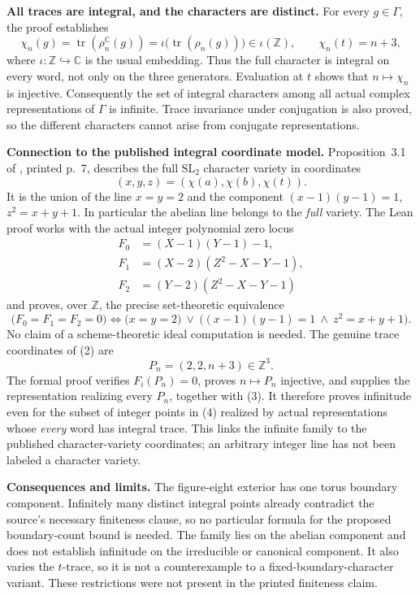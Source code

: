 \documentclass[10pt,a4paper]{article}
\begin{document}
\textbf{All traces are integral, and the characters are distinct.}
For every $g\in\Gamma$, the proof establishes
\[
 \chi_n(g)=\operatorname{tr}(\rho_n^{\mathbb C}(g))
    =\iota\bigl(\operatorname{tr}(\rho_n(g))\bigr)\in\iota(\mathbb Z),
 \qquad \chi_n(t)=n+3, \tag{3}
\]
where $\iota:\mathbb Z\hookrightarrow\mathbb C$ is the usual embedding.
Thus the full character is integral on every word, not only on the three
generators. Evaluation at $t$ shows that $n\mapsto\chi_n$ is injective.
Consequently the set of integral characters among all actual complex
representations of $\Gamma$ is infinite. Trace invariance under conjugation
is also proved, so the different characters cannot arise from conjugate
representations.

\newpage
\textbf{Connection to the published integral coordinate model.}
Proposition~3.1 of \cite{hmp}, printed p.~7, describes the full
$\mathrm{SL}_2$ character variety in coordinates
\[
 (x,y,z)=(\chi(a),\chi(b),\chi(t)).
\]
It is the union of the line $x=y=2$ and the component
$(x-1)(y-1)=1$, $z^2=x+y+1$. In particular the abelian line belongs to
the \emph{full} variety. The Lean proof works with the actual integer
polynomial zero locus
\[
 \begin{split}
 F_0&=(X-1)(Y-1)-1,\\
 F_1&=(X-2)(Z^2-X-Y-1),\\
 F_2&=(Y-2)(Z^2-X-Y-1)
 \end{split} \tag{4}
\]
and proves, over $\mathbb Z$, the precise set-theoretic equivalence
\[
 \bigl(F_0=F_1=F_2=0\bigr)\iff
 \bigl(x=y=2\bigr)\ \lor\
 \bigl((x-1)(y-1)=1\ \land\ z^2=x+y+1\bigr).
\]
No claim of a scheme-theoretic ideal computation is needed.
The genuine trace coordinates of (2) are
\[
 P_n=(2,2,n+3)\in\mathbb Z^3. \tag{5}
\]
The formal proof verifies $F_i(P_n)=0$, proves $n\mapsto P_n$ injective,
and supplies the representation realizing every $P_n$, together with (3).
It therefore proves infinitude even for the subset of integer points in (4)
realized by actual representations whose \emph{every} word has integral trace.
This links the infinite family to the published character-variety coordinates;
an arbitrary integer line has not been labeled a character variety.

\textbf{Consequences and limits.}
The figure-eight exterior has one torus boundary component. Infinitely many
distinct integral points already contradict the source's necessary finiteness
clause, so no particular formula for the proposed boundary-count bound is
needed. The family lies on the abelian component and does not establish
infinitude on the irreducible or canonical component. It also varies the
$t$-trace, so it is not a counterexample to a fixed-boundary-character variant.
These restrictions were not present in the printed finiteness claim.
\end{document}

